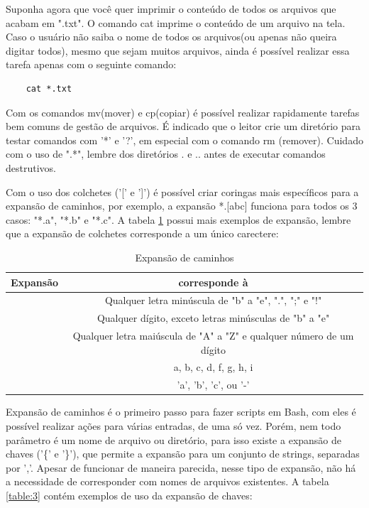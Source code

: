 \documentclass[oneside, 11 pt]{article}
\begin{document}
	Suponha agora que você quer imprimir o conteúdo de todos os arquivos que acabam em ".txt". O comando cat imprime o conteúdo de um arquivo na tela. Caso o usuário não saiba o nome de todos os arquivos(ou apenas não queira digitar todos), mesmo que sejam muitos arquivos, ainda é possível realizar essa tarefa apenas com o seguinte comando:
	\begin{lstlisting}
	cat *.txt
	\end{lstlisting}
	Com os comandos mv(mover) e cp(copiar) é possível realizar rapidamente tarefas bem comuns de gestão de arquivos. É indicado que o leitor crie um diretório para testar comandos com '*' e '?', em especial com o comando rm (remover). Cuidado com o uso de ".*", lembre dos diretórios . e .. antes de executar comandos destrutivos.
	
	Com o uso dos colchetes ('[' e ']') é possível criar coringas mais específicos para a expansão de caminhos, por exemplo, a expansão *.[abc] funciona para todos os 3 casos: "*.a", "*.b" e "*.c". A tabela \ref{table:2} possui mais exemplos de expansão, lembre que a expansão de colchetes corresponde a um único carectere:
	\begin{table}[!ht]
		\centering
		\begin{tabular}{ | c | c | } 
			\hline
			\bfseries Expansão & \bfseries corresponde à \\
			\hline
			[b-e.;!] & Qualquer letra minúscula de "b" a "e", ".", ";" e "!" \\
			\hline
			[!b-e] & Qualquer dígito, exceto letras minúsculas de "b" a "e" \\
			\hline
			[A-Z0-9] & Qualquer letra maiúscula de "A" a "Z" e qualquer número de um dígito \\
			\hline
			[a-df-i] & a, b, c, d, f, g, h, i \\
			\hline
			[abc-] & 'a', 'b', 'c', ou '-' \\
			\hline
		\end{tabular}
		\caption{Expansão de caminhos}
		\label{table:2}
	\end{table}
	
	
	Expansão de caminhos é o primeiro passo para fazer scripts em Bash, com eles é possível realizar ações para várias entradas, de uma só vez. Porém, nem todo parâmetro é um nome de arquivo ou diretório, para isso existe a expansão de chaves ('\{' e '\}'), que permite a expansão para um conjunto de strings, separadas por ','. Apesar de funcionar de maneira parecida, nesse tipo de expansão, não há a necessidade de corresponder com nomes de arquivos existentes. A tabela \ref{table:3} contém exemplos de uso da expansão de chaves:
	
\end{document}
